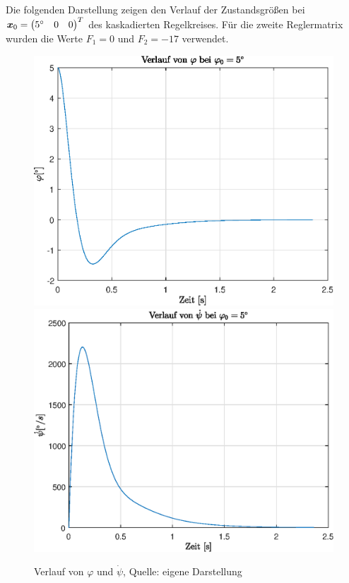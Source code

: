 Die folgenden Darstellung zeigen den Verlauf der Zustandsgrößen bei $\boldsymbol{x}_0=\begin{pmatrix}
5^\circ & 0 & 0
\end{pmatrix}^T$ des kaskadierten Regelkreises. Für die zweite Reglermatrix wurden die Werte $F_1=0$ und $F_2=-17$ verwendet.
\begin{figure}[!h]
\centering
\includegraphics[width=0.45\linewidth]{4_Regelungstechnik/img/x0_phi_kaskadiert}
\includegraphics[width=0.45\linewidth]{4_Regelungstechnik/img/x0_psi__d_kaskadiert}
\caption{Verlauf von $\varphi$ und $\dot{\psi}$, Quelle: eigene Darstellung}
\end{figure}